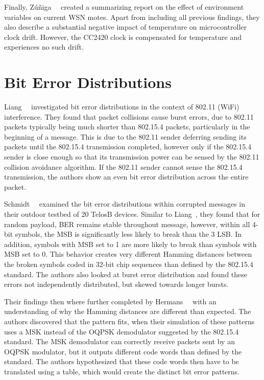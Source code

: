Finally, Z\'{u}\~{n}iga~\etal~\cite{Zuniga2013} created a summarizing report on the effect of environment variables on current \ac{WSN} motes.
Apart from including all previous findings, they also describe a substantial negative impact of temperature on microcontroller clock drift.
However, the CC2420 clock is compensated for temperature and experiences no such drift.


\section{Bit Error Distributions}

Liang~\etal~\cite{Liang2010} investigated bit error distributions in the context of 802.11 (WiFi) interference.
They found that packet collisions cause burst errors, due to 802.11 packets typically being much shorter than 802.15.4 packets, particularly in the beginning of a message.
This is due to the 802.11 sender deferring sending its packets until the 802.15.4 transmission completed, however only if the 802.15.4 sender is close enough so that its transmission power can be sensed by the 802.11 collision avoidance algorithm.
If the 802.11 sender cannot sense the 802.15.4 transmission, the authors show an even bit error distribution across the entire packet.

Schmidt~\etal~\cite{Schmidt2013} examined the bit error distributions within corrupted messages in their outdoor testbed of 20 TelosB devices.
Similar to Liang~\etal, they found that for random payload, \ac{BER} remains stable throughout message, however, within all 4-bit symbols, the \ac{MSB} is significantly less likely to break than the 3 \ac{LSB}.
In addition, symbols with \ac{MSB} set to 1 are more likely to break than symbols with \ac{MSB} set to 0.
This behavior creates very different Hamming distances between the broken symbols coded in 32-bit chip sequences than defined by the 802.15.4 standard.
The authors also looked at burst error distribution and found these errors not independently distributed, but skewed towards longer bursts.

Their findings then where further completed by Hermans~\etal~\cite{Hermans2014} with an understanding of why the Hamming distances are different than expected.
The authors discovered that the pattern fits, when their simulation of these patterns uses a \ac{MSK} instead of the \ac{OQPSK} demodulator suggested by the 802.15.4 standard.
The \ac{MSK} demodulator can correctly receive packets sent by an \ac{OQPSK} modulator, but it outputs different code words than defined by the standard.
The authors hypothesized that these code words then have to be translated using a table, which would create the distinct bit error patterns.


